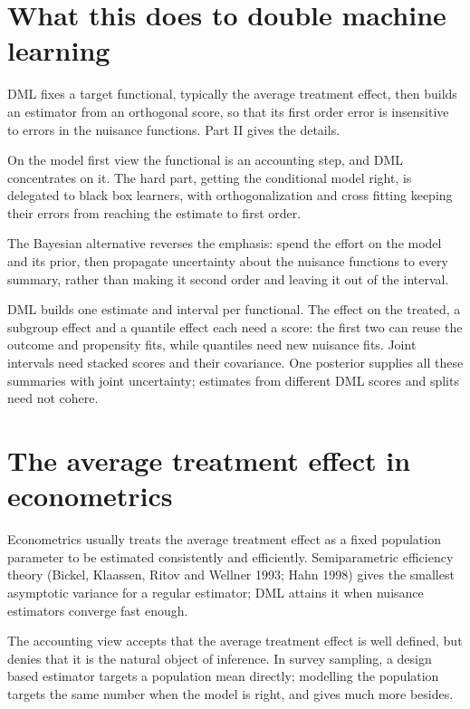 \section{What this does to double machine learning}

DML fixes a target functional, typically the average treatment effect, then builds an estimator from an orthogonal score, so that its first order error is insensitive to errors in the nuisance functions. Part II gives the details.

On the model first view the functional is an accounting step, and DML concentrates on it. The hard part, getting the conditional model right, is delegated to black box learners, with orthogonalization and cross fitting keeping their errors from reaching the estimate to first order.

The Bayesian alternative reverses the emphasis: spend the effort on the model and its prior, then propagate uncertainty about the nuisance functions to every summary, rather than making it second order and leaving it out of the interval.

DML builds one estimate and interval per functional. The effect on the treated, a subgroup effect and a quantile effect each need a score: the first two can reuse the outcome and propensity fits, while quantiles need new nuisance fits. Joint intervals need stacked scores and their covariance. One posterior supplies all these summaries with joint uncertainty; estimates from different DML scores and splits need not cohere.

\section{The average treatment effect in econometrics}

Econometrics usually treats the average treatment effect as a fixed population parameter to be estimated consistently and efficiently. Semiparametric efficiency theory (Bickel, Klaassen, Ritov and Wellner 1993; Hahn 1998) gives the smallest asymptotic variance for a regular estimator; DML attains it when nuisance estimators converge fast enough.

The accounting view accepts that the average treatment effect is well defined, but denies that it is the natural object of inference. In survey sampling, a design based estimator targets a population mean directly; modelling the population targets the same number when the model is right, and gives much more besides.

